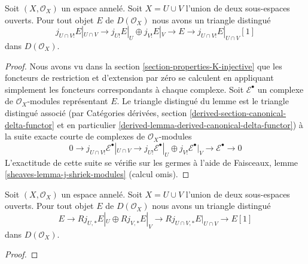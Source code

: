 {\begin{lemma}
\label{lemma-exact-sequence-lower-shriek}
Soit $(X, \mathcal{O}_X)$ un espace annelé. Soit $X = U \cup V$ l'union de deux sous-espaces ouverts. Pour tout objet $E$ de $D(\mathcal{O}_X)$ nous avons un triangle distingué $$
j_{U \cap V!}E|_{U \cap V} \to
j_{U!}E|_U \oplus j_{V!}E|_V \to E \to 
j_{U \cap V!}E|_{U \cap V}[1]
$$ dans $D(\mathcal{O}_X)$.
\end{lemma}

\begin{proof}

Nous avons vu dans la section \ref{section-properties-K-injective}
que les foncteurs de restriction et d'extension par zéro se calculent en appliquant simplement les foncteurs correspondants à chaque complexe. Soit $\mathcal{E}^\bullet$ un complexe de $\mathcal{O}_X$-modules représentant $E$. Le triangle distingué du lemme est le triangle distingué associé (par Catégories dérivées, section
\ref{derived-section-canonical-delta-functor} et en particulier \ref{derived-lemma-derived-canonical-delta-functor}) à la suite exacte courte de complexes de $\mathcal{O}_X$-modules
$$
0 \to j_{U \cap V!}\mathcal{E}^\bullet|_{U \cap V} \to
j_{U!}\mathcal{E}^\bullet|_U \oplus j_{V!}\mathcal{E}^\bullet|_V
\to \mathcal{E}^\bullet \to 0
$$
L'exactitude de cette suite se vérifie sur les germes à l'aide de Faisceaux, lemme \ref{sheaves-lemma-j-shriek-modules}
(calcul omis).

\end{proof}

\begin{lemma}

\label{lemma-exact-sequence-j-star}
Soit $(X, \mathcal{O}_X)$ un espace annelé. Soit $X = U \cup V$ l'union de deux sous-espaces ouverts. Pour tout objet $E$ de $D(\mathcal{O}_X)$ nous avons un triangle distingué $$
E \to 
Rj_{U, *}E|_U \oplus Rj_{V, *}E|_V \to
Rj_{U \cap V, *}E|_{U \cap V} \to
E[1]
$$ dans $D(\mathcal{O}_X)$.
\end{lemma}

\begin{proof}


\end{proof}}
